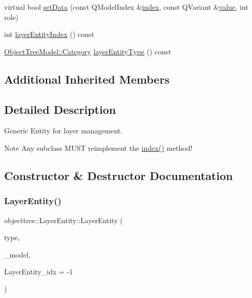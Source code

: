 \begin{DoxyCompactItemize}
virtual bool \mbox{\hyperlink{classobjecttree_1_1_layer_entity_ab78f47ee5a0de3e3a3ee03abcafc3097}{set\+Data}} (const Q\+Model\+Index \&\mbox{\hyperlink{classobjecttree_1_1_layer_entity_a168d47ed5cdde5455a5b0f124cbee0a9}{index}}, const Q\+Variant \&\mbox{\hyperlink{diffusion_8cpp_a4b41795815d9f3d03abfc739e666d5da}{value}}, int role)
\item 
int \mbox{\hyperlink{classobjecttree_1_1_layer_entity_a4f7c60c97a80aa01905acceb66755b77}{layer\+Entity\+Index}} () const
\item 
\mbox{\hyperlink{class_object_tree_model_a379e9d6b0d381853785adf62095ba4e3}{Object\+Tree\+Model\+::\+Category}} \mbox{\hyperlink{classobjecttree_1_1_layer_entity_ae4a92e8de339e70177a37c7376e2880d}{layer\+Entity\+Type}} () const
\end{DoxyCompactItemize}
\subsection*{Additional Inherited Members}


\subsection{Detailed Description}
Generic Entity for layer management. 

\begin{DoxyNote}{Note}
Any subclass M\+U\+ST reimplement the \mbox{\hyperlink{classobjecttree_1_1_layer_entity_a168d47ed5cdde5455a5b0f124cbee0a9}{index()}} method! 
\end{DoxyNote}


\subsection{Constructor \& Destructor Documentation}
\mbox{\label{classobjecttree_1_1_layer_entity_a19639a7880438c625c70622cc7cc57d1}} 
\subsubsection{\texorpdfstring{LayerEntity()}{LayerEntity()}}
{\footnotesize\ttfamily objecttree\+::\+Layer\+Entity\+::\+Layer\+Entity (\begin{DoxyParamCaption}\item[{\mbox{\hyperlink{class_object_tree_model_a379e9d6b0d381853785adf62095ba4e3}{Object\+Tree\+Model\+::\+Category}}}]{type,  }\item[{\mbox{\hyperlink{class_object_tree_model}{Object\+Tree\+Model}} $\ast$}]{\+\_\+model,  }\item[{int}]{Layer\+Entity\+\_\+idx = {\ttfamily -\/1} }\end{DoxyParamCaption})}

